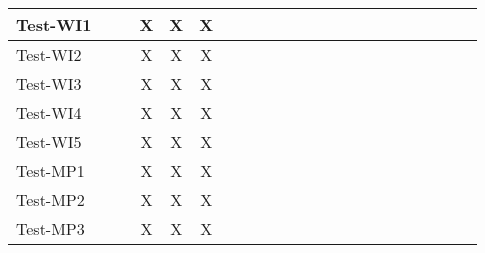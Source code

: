 \documentclass[12pt, titlepage]{article}
\begin{document}
\begin{landscape}
\begin{table}[H]
\begin{adjustwidth}{-0.1in}{-1in}
{\begin{tabular}{|c|c|c|c|c|c|c|c|c|c|c|c|c|c|c|c|c|c|c|c|c|c|}
\multicolumn{1}{|l|}{{Test-WI1}}   &             &              &      X       &     X         &   X          &             &             &             &              &              &             &             &              &             &              &                & & & & &\\ \hline
\multicolumn{1}{|l|}{{Test-WI2}}   &             &              &      X       &     X         &   X          &             &             &             &              &              &             &             &              &             &              &                & & & & &\\ \hline
\multicolumn{1}{|l|}{{Test-WI3}}   &             &              &      X       &     X         &   X          &             &             &             &              &              &             &             &              &             &              &                & & & & &\\ \hline
\multicolumn{1}{|l|}{{Test-WI4}}   &             &              &      X       &     X         &   X          &             &             &             &              &              &             &             &              &             &              &                & & & & &\\ \hline
\multicolumn{1}{|l|}{{Test-WI5}}   &             &              &      X       &     X         &   X          &             &             &             &              &              &             &             &              &             &              &                & & & & &\\ \hline
\multicolumn{1}{|l|}{{Test-MP1}} &             &              &      X       &     X         &   X          &             &             &             &              &              &             &             &              &             &              &                & & & & &\\ \hline
\multicolumn{1}{|l|}{{Test-MP2}}  &             &              &      X       &     X         &   X          &             &             &             &              &              &             &             &              &             &              &                & & & & &\\ \hline
\multicolumn{1}{|l|}{{Test-MP3}}  &             &              &      X       &     X         &   X          &             &             &             &              &              &             &             &              &             &              &                & & & & &\\ \hline

\end{tabular}}
\end{adjustwidth}
\end{table}
\end{landscape}
\end{document}
